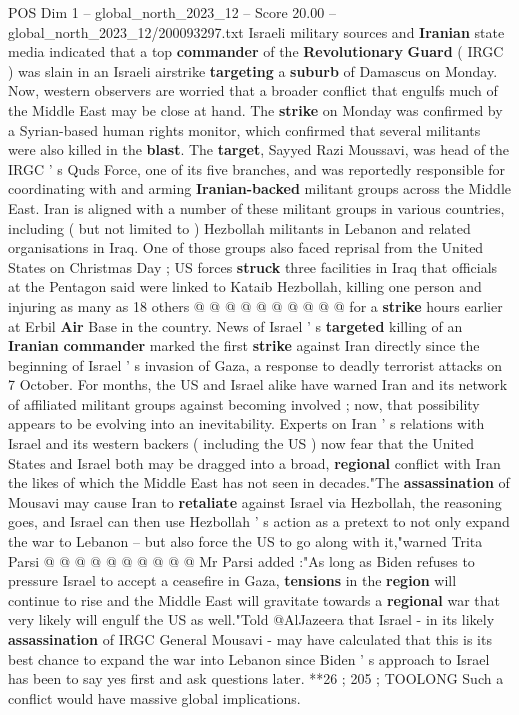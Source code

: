 \begin{textsample}{POS Dim 1 – global\_north\_2023\_12 – Score 20.00 – global\_north\_2023\_12/200093297.txt}  \label{ex:f1_pos_254}
Israeli military sources and \textbf{Iranian} state media indicated that a top \textbf{commander} of the \textbf{Revolutionary} \textbf{Guard} ( IRGC ) was slain in an Israeli airstrike \textbf{targeting} a \textbf{suburb} of Damascus on Monday.
Now, western observers are worried that a broader conflict that engulfs much of the Middle East may be close at hand.
The \textbf{strike} on Monday was confirmed by a Syrian-based human rights monitor, which confirmed that several militants were also killed in the \textbf{blast}.
The \textbf{target}, Sayyed Razi Moussavi, was head of the IRGC ' s Quds Force, one of its five branches, and was reportedly responsible for coordinating with and arming \textbf{Iranian-backed} militant groups across the Middle East.
Iran is aligned with a number of these militant groups in various countries, including ( but not limited to ) Hezbollah militants in Lebanon and related organisations in Iraq.
One of those groups also faced reprisal from the United States on Christmas Day ; US forces \textbf{struck} three facilities in Iraq that officials at the Pentagon said were linked to Kataib Hezbollah, killing one person and injuring as many as 18 others @ @ @ @ @ @ @ @ @ @ for a \textbf{strike} hours earlier at Erbil \textbf{Air} Base in the country.
News of Israel ' s \textbf{targeted} killing of an \textbf{Iranian} \textbf{commander} marked the first \textbf{strike} against Iran directly since the beginning of Israel ' s invasion of Gaza, a response to deadly terrorist attacks on 7 October.
For months, the US and Israel alike have warned Iran and its network of affiliated militant groups against becoming involved ; now, that possibility appears to be evolving into an inevitability.
Experts on Iran ' s relations with Israel and its western backers ( including the US ) now fear that the United States and Israel both may be dragged into a broad, \textbf{regional} conflict with Iran the likes of which the Middle East has not seen in decades."The \textbf{assassination} of Mousavi may cause Iran to \textbf{retaliate} against Israel via Hezbollah, the reasoning goes, and Israel can then use Hezbollah ' s action as a pretext to not only expand the war to Lebanon -- but also force the US to go along with it,"warned Trita Parsi @ @ @ @ @ @ @ @ @ @ Mr Parsi added :"As long as Biden refuses to pressure Israel to accept a ceasefire in Gaza, \textbf{tensions} in the \textbf{region} will continue to rise and the Middle East will gravitate towards a \textbf{regional} war that very likely will engulf the US as well."Told @AlJazeera that Israel - in its likely \textbf{assassination} of IRGC General Mousavi - may have calculated that this is its best chance to expand the war into Lebanon since Biden ' s approach to Israel has been to say yes first and ask questions later. **26 ; 205 ; TOOLONG Such a conflict would have massive global implications.

\end{textsample}
